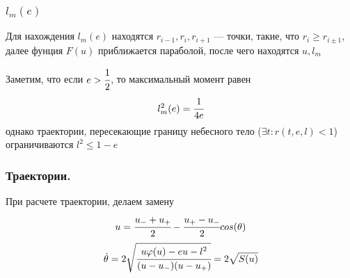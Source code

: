 	
	\subsubsection{$l_m(e)$}
	Для нахождения $l_m(e)$ находятся $r_{i-1},r_i, r_{i+1}$ --- точки, такие, что $r_i \ge r_{i\pm1}$, далее фунция $F(u)$ приближается параболой, после чего находятся $u, l_m$
	
	Заметим, что если $e>\cfrac{1}{2}$, то максимальный момент равен
	\begin{equation*}
		l^2_m(e) = \cfrac{1}{4e}
	\end{equation*}
	однако траектории, пересекающие границу небесного тело ($\exists t: r(t,e,l) < 1$) ограничиваются $l^2 \le 1 - e$
	
	
	
	
		\subsubsection{Траектории.}
	При расчете траектории, делаем замену
	\begin{equation}
		u = \cfrac{u_{-}+u_{+}}{2} - \cfrac{u_{+}-u_{-}}{2}cos(\theta)
		\label{eq:tr_in_func}
	\end{equation}
	\begin{equation*}
		\dot{\theta} = 2\sqrt{ \cfrac{u\varphi(u)-eu-l^2}{(u-u_{-})(u-u_{+})} } = 2\sqrt{S(u)}
	\end{equation*}
	
